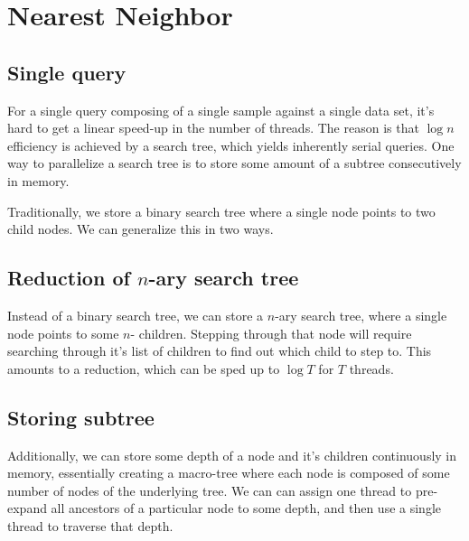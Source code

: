 \section{Nearest Neighbor}


\subsection{Single query}
For a single query composing of a single sample against a single data set, it's hard to get a linear speed-up in the number of threads. The reason is that $\log n$ efficiency is achieved by a search tree, which yields inherently serial queries. One way to parallelize a search tree is to store some amount of a subtree consecutively in memory. 

Traditionally, we store a binary search tree where a single node points to two child nodes. We can generalize this in two ways. 

\subsection{Reduction of $n$-ary search tree}
Instead of a binary search tree, we can store a $n$-ary search tree, where a single node points to some $n$- children. Stepping through that node will require searching through it's list of children to find out which child to step to. This amounts to a reduction, which can be sped up to $\log T$ for $T$ threads. 

\begin{figure}[H]
\begin{centering}
    \texttt{[image: \\figfile\{fig/nary\_search\_tree]}}
    \caption{$n$-ary Search Tree}
    \label{fig:nary_tree}
\end{centering}
\end{figure}

\subsection{Storing subtree}
Additionally, we can store some depth of a node and it's children continuously in memory, essentially creating a macro-tree where each node is composed of some number of nodes of the underlying tree. We can can assign one thread to pre-expand all ancestors of a particular node to some depth, and then use a single thread to traverse that depth.

 \begin{figure}[H]
\begin{centering}
    \texttt{[image: \\figfile\{fig/ddepth\_macro\_tree]}}
    \caption{$d$-depth Search Tree}
    \label{fig:ddepth_tree}
\end{centering}
\end{figure}

